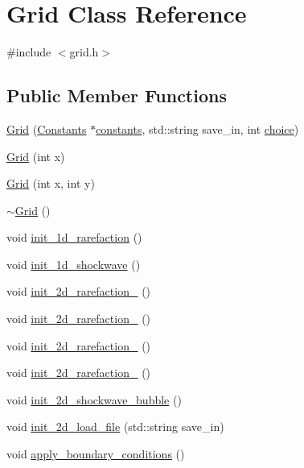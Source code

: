 \hypertarget{classGrid}{\section{Grid Class Reference}
\label{classGrid}
}


{\ttfamily \#include $<$grid.\-h$>$}

\subsection*{Public Member Functions}
\begin{DoxyCompactItemize}
\item 
\hyperlink{classGrid_adf92756bdccf95fc9e3fedac017cc7d0}{Grid} (\hyperlink{classConstants}{Constants} $\ast$\hyperlink{classGrid_a9e529cbb3ec0b42c8b232be05923a030}{constants}, std\-::string save\-\_\-in, int \hyperlink{classGrid_af55897b809ffd9733f6723c8a23d89a5}{choice})
\item 
\hyperlink{classGrid_a01fb58c88ad3ac4a6c2a1eba5742dc7a}{Grid} (int x)
\item 
\hyperlink{classGrid_a338e0b1ffbad1cf5fdf960d7511b4857}{Grid} (int x, int y)
\item 
\hyperlink{classGrid_a3661d0a7f998caaaf8627d7a67072116}{$\sim$\-Grid} ()
\item 
void \hyperlink{classGrid_a1c67c94bc8e4a5dec66934b11129ff63}{init\-\_\-1d\-\_\-rarefaction} ()
\item 
void \hyperlink{classGrid_a491f89e29ba29b1034d4972df9679352}{init\-\_\-1d\-\_\-shockwave} ()
\item 
void \hyperlink{classGrid_a76f8642b671a34b93c195f7266b6e0d4}{init\-\_\-2d\-\_\-rarefaction\-\_} ()
\item 
void \hyperlink{classGrid_a30aa151fda2f732bb542c02a5de26eee}{init\-\_\-2d\-\_\-rarefaction\-\_} ()
\item 
void \hyperlink{classGrid_aff04070089defd8f9100eaff9e6c6fc2}{init\-\_\-2d\-\_\-rarefaction\-\_} ()
\item 
void \hyperlink{classGrid_a3957a41dc0ced492623c46644ca41b4f}{init\-\_\-2d\-\_\-rarefaction\-\_} ()
\item 
void \hyperlink{classGrid_a497011f31b5116f6f691fe2e51c4674d}{init\-\_\-2d\-\_\-shockwave\-\_\-bubble} ()
\item 
void \hyperlink{classGrid_ad2ea723ca3cf2642b3741716fc7c08a7}{init\-\_\-2d\-\_\-load\-\_\-file} (std\-::string save\-\_\-in)
\item 
void \hyperlink{classGrid_a471f6095ce574138fccaff0cad567825}{apply\-\_\-boundary\-\_\-conditions} ()
\end{DoxyCompactItemize}
